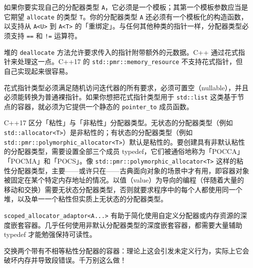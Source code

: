 如果你要实现自己的分配器类型 \texttt{A}，它必须是一个模板；其第一个模板参数应当是它期望 \texttt{allocate} 的类型 \texttt{T}。你的分配器类型 \texttt{A} 还必须有一个模板化的构造函数，以支持从 \texttt{A<\allowbreak{}U>\allowbreak{}} 到 \texttt{A<\allowbreak{}T>\allowbreak{}} 的「重绑定」。与任何其他种类的指针一样，分配器类型必须支持 \texttt{==} 和 \texttt{!=} 运算符。

堆的 \texttt{deallocate} 方法允许要求传入的指针附带额外的元数据。C++ 通过花式指针来处理这一点。C++17 的 \texttt{std::\allowbreak{}pmr::\allowbreak{}memory\_\allowbreak{}resource} 不支持花式指针，但自己实现起来很容易。

花式指针类型必须满足随机访问迭代器的所有要求，必须可置空（nullable），并且必须能转换为普通裸指针。如果你想把花式指针类型用于 \texttt{std::\allowbreak{}list} 这类基于节点的容器，就必须为它提供一个静态的 \texttt{pointer\_\allowbreak{}to} 成员函数。

C++17 区分「粘性」与「非粘性」分配器类型。无状态的分配器类型（例如 \texttt{std::\allowbreak{}allocator<\allowbreak{}T>\allowbreak{}}）是非粘性的；有状态的分配器类型（例如 \texttt{std::\allowbreak{}pmr::\allowbreak{}polymorphic\_\allowbreak{}allocator<\allowbreak{}T>\allowbreak{}}）默认是粘性的。要创建具有非默认粘性的分配器类型，需要设置全部三个成员 typedef，它们被通俗地称为「POCCA」「POCMA」和「POCS」。像 \texttt{std::\allowbreak{}pmr::\allowbreak{}polymorphic\_\allowbreak{}allocator<\allowbreak{}T>\allowbreak{}} 这样的粘性分配器类型，主要——或许只在——古典面向对象的场景中才有用，即容器对象被固定在某个特定内存地址的情况。以值（value）为导向的编程（伴随着大量的移动和交换）需要无状态分配器类型，否则就要求程序中的每个人都使用同一个堆，以及单一一个粘性但实质上无状态的分配器类型。

\texttt{scoped\_\allowbreak{}allocator\_\allowbreak{}adaptor<\allowbreak{}A...>} 有助于简化使用自定义分配器或内存资源的深度嵌套容器。几乎任何使用非默认分配器类型的深度嵌套容器，都需要大量辅助 typedef 才能勉强保持可读性。

交换两个带有不相等粘性分配器的容器：理论上这会引发未定义行为，实际上它会破坏内存并导致段错误。千万别这么做！
